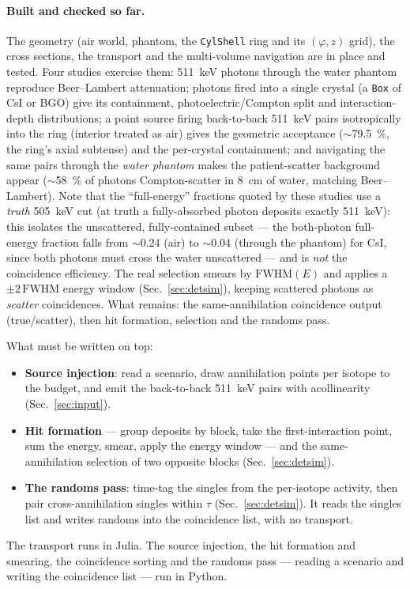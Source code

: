 \documentclass[11pt]{article}
\begin{document}
\paragraph{Built and checked so far.} The geometry (air world, phantom, the
\texttt{CylShell} ring and its $(\varphi,z)$ grid), the cross sections, the transport and
the multi-volume navigation are in place and tested. Four studies exercise them:
\SI{511}{keV} photons through the water phantom reproduce Beer--Lambert attenuation;
photons fired into a single crystal (a \texttt{Box} of CsI or BGO) give its containment,
photoelectric/Compton split and interaction-depth distributions; a point source firing
back-to-back \SI{511}{keV} pairs isotropically into the ring (interior treated as air)
gives the geometric acceptance ($\sim$\SI{79.5}{\percent}, the ring's axial subtense) and
the per-crystal containment; and navigating the same pairs through the \emph{water
phantom} makes the patient-scatter background appear ($\sim$\SI{58}{\percent} of photons
Compton-scatter in \SI{8}{cm} of water, matching Beer--Lambert). Note that the
``full-energy'' fractions quoted by these studies use a \emph{truth} \SI{505}{keV} cut
(at truth a fully-absorbed photon deposits exactly \SI{511}{keV}): this isolates the
unscattered, fully-contained subset --- the both-photon full-energy fraction falls from
$\sim$0.24 (air) to $\sim$0.04 (through the phantom) for CsI, since both photons must
cross the water unscattered --- and is \emph{not} the coincidence efficiency. The real
selection smears by $\mathrm{FWHM}(E)$ and applies a $\pm2\,\mathrm{FWHM}$ energy window
(Sec.~\ref{sec:detsim}), keeping scattered photons as \emph{scatter} coincidences. What
remains: the same-annihilation coincidence output (true/scatter), then hit formation,
selection and the randoms pass.

What must be written on top:
\begin{itemize}[nosep]
\item \textbf{Source injection}: read a scenario, draw annihilation points per isotope to
the budget, and emit the back-to-back \SI{511}{keV} pairs with acollinearity
(Sec.~\ref{sec:input}).
\item \textbf{Hit formation} --- group deposits by block, take the first-interaction point,
sum the energy, smear, apply the energy window --- and the same-annihilation selection of
two opposite blocks (Sec.~\ref{sec:detsim}).
\item \textbf{The randoms pass}: time-tag the singles from the per-isotope activity, then
pair cross-annihilation singles within $\tau$ (Sec.~\ref{sec:detsim}). It reads the
singles list and writes randoms into the coincidence list, with no transport.
\end{itemize}

The transport runs in Julia. The source injection, the hit formation and smearing, the
coincidence sorting and the randoms pass --- reading a scenario and writing the
coincidence list --- run in Python.
\end{document}
